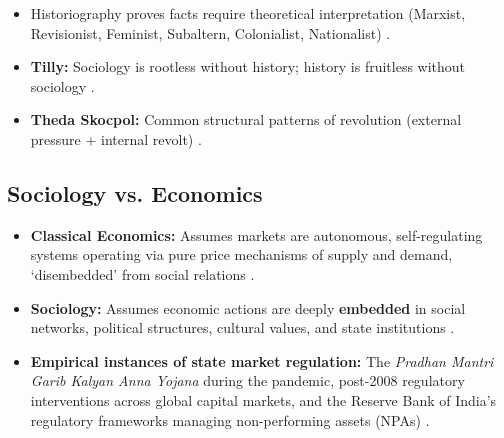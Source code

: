 \begin{QuickRevision}
\begin{itemize}
    \item Historiography proves facts require theoretical interpretation (Marxist, Revisionist, Feminist, Subaltern, Colonialist, Nationalist) .
    \item \textbf{Tilly:} Sociology is rootless without history; history is fruitless without sociology .
    \item \textbf{Theda Skocpol:} Common structural patterns of revolution (external pressure + internal revolt) .
\end{itemize}
\end{QuickRevision}

\subsection{Sociology vs. Economics}

\begin{ComparisonBox}
\begin{itemize}
    \item \textbf{Classical Economics:} Assumes markets are autonomous, self-regulating systems operating via pure price mechanisms of supply and demand, `disembedded' from social relations .
    \item \textbf{Sociology:} Assumes economic actions are deeply \textbf{embedded} in social networks, political structures, cultural values, and state institutions .
    \item \textbf{Empirical instances of state market regulation:} The \textit{Pradhan Mantri Garib Kalyan Anna Yojana} during the pandemic, post-2008 regulatory interventions across global capital markets, and the Reserve Bank of India's regulatory frameworks managing non-performing assets (NPAs) .
\end{itemize}
\end{ComparisonBox}

